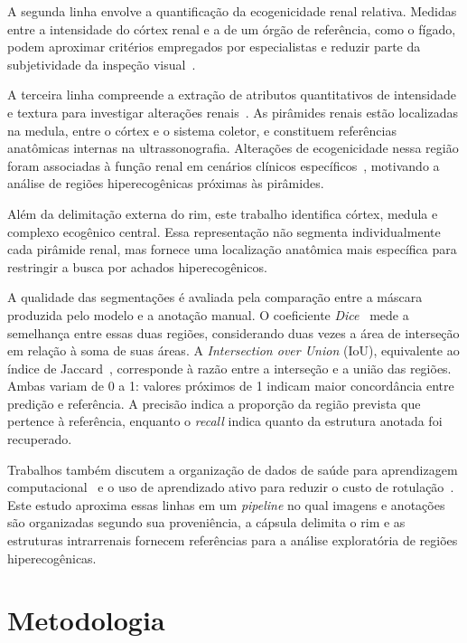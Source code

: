 \documentclass[12pt]{article}
\begin{document}
A segunda linha envolve a quantificação da ecogenicidade renal relativa. Medidas entre a intensidade do córtex renal e a de um órgão de referência, como o fígado, podem aproximar critérios empregados por especialistas e reduzir parte da subjetividade da inspeção visual~\cite{Manley2001}.

A terceira linha compreende a extração de atributos quantitativos de intensidade e textura para investigar alterações renais~\cite{Chavhan2008}. As pirâmides renais estão localizadas na medula, entre o córtex e o sistema coletor, e constituem referências anatômicas internas na ultrassonografia. Alterações de ecogenicidade nessa região foram associadas à função renal em cenários clínicos específicos~\cite{Chavhan2008}, motivando a análise de regiões hiperecogênicas próximas às pirâmides.

Além da delimitação externa do rim, este trabalho identifica córtex, medula e complexo ecogênico central. Essa representação não segmenta individualmente cada pirâmide renal, mas fornece uma localização anatômica mais específica para restringir a busca por achados hiperecogênicos.

A qualidade das segmentações é avaliada pela comparação entre a máscara produzida pelo modelo e a anotação manual. O coeficiente \textit{Dice}~\cite{Dice1945} mede a semelhança entre essas duas regiões, considerando duas vezes a área de interseção em relação à soma de suas áreas. A \textit{Intersection over Union} (IoU), equivalente ao índice de Jaccard~\cite{Jaccard1901}, corresponde à razão entre a interseção e a união das regiões. Ambas variam de 0 a 1: valores próximos de 1 indicam maior concordância entre predição e referência. A precisão indica a proporção da região prevista que pertence à referência, enquanto o \textit{recall} indica quanto da estrutura anotada foi recuperado.

Trabalhos também discutem a organização de dados de saúde para aprendizagem computacional~\cite{Lima2021DataLakeSaude} e o uso de aprendizado ativo para reduzir o custo de rotulação~\cite{Constantino2022SBBD}. Este estudo aproxima essas linhas em um \textit{pipeline} no qual imagens e anotações são organizadas segundo sua proveniência, a cápsula delimita o rim e as estruturas intrarrenais fornecem referências para a análise exploratória de regiões hiperecogênicas.

\section{Metodologia}
\end{document}
